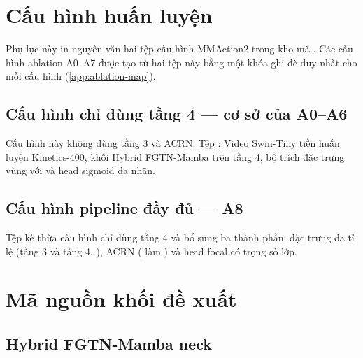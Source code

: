 
\chapter{Cấu hình huấn luyện}
\label{app:config}

Phụ lục này in nguyên văn hai tệp cấu hình MMAction2 trong kho mã . Các cấu hình ablation A0--A7 được tạo từ hai tệp này bằng một khóa ghi đè duy nhất cho mỗi cấu hình (\cref{app:ablation-map}).

\section{Cấu hình chỉ dùng tầng 4 --- cơ sở của A0--A6}
\label{app:config-single}

Cấu hình này không dùng tầng 3 và ACRN. Tệp : Video Swin-Tiny tiền huấn luyện Kinetics-400, khối Hybrid FGTN-Mamba trên tầng 4, bộ trích đặc trưng vùng  với  và head sigmoid đa nhãn.


\section{Cấu hình pipeline đầy đủ --- A8}
\label{app:config-full}

Tệp  kế thừa cấu hình chỉ dùng tầng 4 và bổ sung ba thành phần: đặc trưng đa tỉ lệ (tầng 3 và tầng 4, ), ACRN ( làm ) và head focal có trọng số lớp.


\chapter{Mã nguồn khối đề xuất}
\label{app:code}

\section{Hybrid FGTN-Mamba neck}

